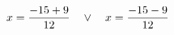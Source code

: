 \documentclass[preview]{standalone}
\begin{document}
\begin{align*}
\special{dvisvgm:raw <g id='unique000'>}x=\frac{-15 + 9}{12} \quad \lor \quad x=\frac{-15 - 9}{12}\special{dvisvgm:raw </g>}
\end{align*}
\end{document}
